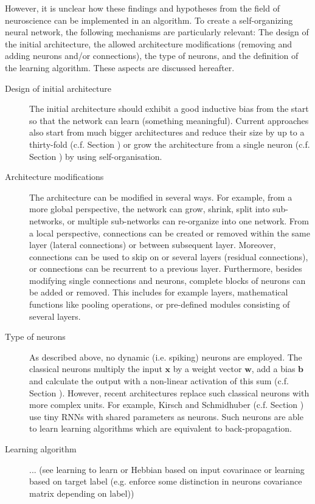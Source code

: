 However, it is unclear how these findings and hypotheses from the field of neuroscience can be implemented in an algorithm.
To create a self-organizing neural network, the following mechanisms are particularly relevant: The design of the initial architecture, the allowed architecture modifications (removing and adding neurons and/or connections), the type of neurons, and the definition of the learning algorithm.
These aspects are discussed hereafter.

\begin{description}
   \item[Design of initial architecture] The initial architecture should exhibit a good inductive bias from the start so that the network can learn (something meaningful). Current approaches also start from much bigger architectures and reduce their size by up to a thirty-fold  (c.f. Section ) or grow the architecture from a single neuron  (c.f. Section ) by using self-organisation.
   \item[Architecture modifications] The architecture can be modified in several ways. For example, from a more global perspective, the network can grow, shrink, split into sub-networks, or multiple sub-networks can re-organize into one network. From a local perspective, connections can be created or removed within the same layer (lateral connections) or between subsequent layer. Moreover, connections can be used to skip on or several layers (residual connections), or connections can be recurrent to a previous layer. Furthermore, besides modifying single connections and neurons, complete blocks of neurons can be added or removed. This includes for example layers, mathematical functions like pooling operations, or pre-defined modules consisting of several layers.
   \item[Type of neurons] As described above, no dynamic (i.e. spiking) neurons are employed. The classical neurons multiply the input \(\boldsymbol{x}\) by a weight vector \(\boldsymbol{w}\), add a bias \(\boldsymbol{b}\) and calculate the output with a non-linear activation of this sum (c.f. Section ). However, recent architectures replace such classical neurons with more complex units. For example, Kirsch and Schmidhuber  (c.f. Section ) use tiny RNNs with shared parameters as neurons. Such neurons are able to learn learning algorithms which are equivalent to back-propagation.
   \item[Learning algorithm] ... (see learning to learn or Hebbian based on input covarinace or learning based on target label (e.g. enforce some distinction in neurons covariance matrix depending on label))
\end{description}


